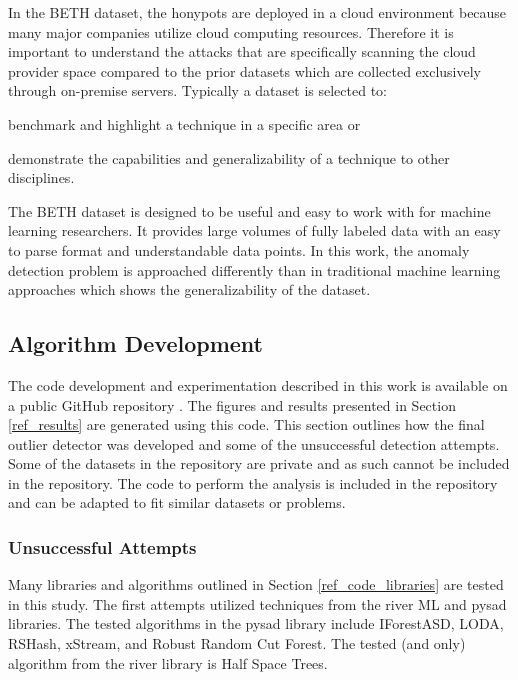 In the BETH dataset, the honypots are deployed in a cloud environment because many major companies utilize cloud computing resources. 
Therefore it is important to understand the attacks that are specifically scanning the cloud provider space compared to the prior datasets which are collected exclusively through on-premise servers.
Typically a dataset is selected to:
\begin{inlinelist}
    \item benchmark and highlight a technique in a specific area or
    \item demonstrate the capabilities and generalizability of a technique to other disciplines.
\end{inlinelist}
The BETH dataset is designed to be useful and easy to work with for machine learning researchers.
It provides large volumes of fully labeled data with an easy to parse format and understandable data points.
In this work, the anomaly detection problem is approached differently than in traditional machine learning approaches which shows the generalizability of the dataset.

\subsection{Algorithm Development}
The code development and experimentation described in this work is available on a public GitHub repository \parencite{BeattieGithub2022}.
The figures and results presented in Section \ref{ref_results} are generated using this code.
This section outlines how the final outlier detector was developed and some of the unsuccessful detection attempts.
Some of the datasets in the repository are private and as such cannot be included in the repository.
The code to perform the analysis is included in the repository and can be adapted to fit similar datasets or problems.

\subsubsection{Unsuccessful Attempts}

Many libraries and algorithms outlined in Section \ref{ref_code_libraries} are tested in this study.
The first attempts utilized techniques from the river ML \parencite{2020river} and pysad \parencite{pysad} libraries.
The tested algorithms in the pysad library include IForestASD, LODA, RSHash, xStream, and Robust Random Cut Forest.
The tested (and only) algorithm from the river library is Half Space Trees.

